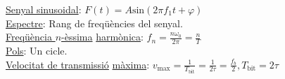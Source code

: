 \documentclass[12pt]{article}
\begin{document}
\begin{multicols}{5}
\underline{Senyal sinusoidal}: $F(t) = A\text{sin}(2\pi f_1t+ \varphi)$ \\
\underline{Espectre}: Rang de freqüències del senyal. \\
\underline{Freqüència $n$-èssima} \underline{harmònica}: $f_n = \frac{n\omega_0}{2\pi} = \frac{n}{T}$ \\
\underline{Pols}: Un cicle. \\
\underline{Velocitat de transmissió} \underline{màxima}: $v_\text{max} = \frac{1}{T_\text{bit}} = \frac{1}{2\tau} = \frac{f_b}{2}, T_{\text{bit}} = 2 \tau$ \\
\end{multicols}
\end{document}
